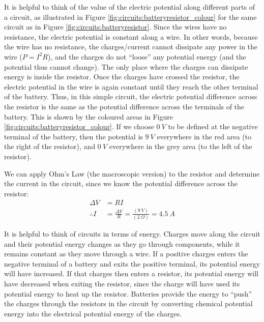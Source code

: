 It is helpful to think of the value of the electric potential along different parts of a circuit, as illustrated in Figure \ref{fig:circuits:batteryresistor_colour} for the same circuit as in Figure \ref{fig:circuits:batteryresistor}.
Since the wires have no resistance, the electric potential is constant along a wire. In other words, because the wire has no resistance, the charges/current cannot dissipate any power in the wire ($P=I^2R$), and the charges do not ``loose'' any potential energy (and the potential thus cannot change). The only place where the charges can dissipate energy is inside the resistor. Once the charges have crossed the resistor, the electric potential in the wire is again constant until they reach the other terminal of the battery. Thus, in this simple circuit, the electric potential difference across the resistor is the same as the potential difference across the terminals of the battery.  This is shown by the coloured areas in Figure \ref{fig:circuits:batteryresistor_colour}. If we choose $\SI{0}{V}$ to be defined at the negative terminal of the battery, then the potential is $\SI{9}{V}$ everywhere in the red area (to the right of the resistor), and $\SI{0}{V}$ everywhere in the grey area (to the left of the resistor). 


We can apply Ohm's Law (the macroscopic version) to the resistor and determine the current in the circuit, since we know the potential difference across the resistor:
\begin{align*}
\Delta V&=RI\\
\therefore I&=\frac{\Delta V}{R}=\frac{(\SI{9}{V})}{(\SI{2}{\Omega})}=\SI{4.5}{A}
\end{align*}

It is helpful to think of circuits in terms of energy. Charges move along the circuit and their potential energy changes as they go through components, while it remains constant as they move through a wire. If a positive charges enters the negative terminal of a battery and exits the positive terminal, its potential energy will have increased. If that charges then enters a resistor, its potential energy will have decreased when exiting the resistor, since the charge will have used its potential energy to heat up the resistor. Batteries provide the energy to ``push'' the charges through the resistors in the circuit by converting chemical potential energy into the electrical potential energy of the charges.

